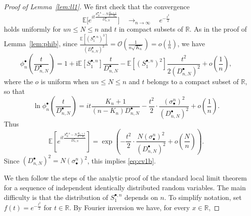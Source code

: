 \documentclass[AHL,XML,longabstracts,Unicode]{cedram}
\newcommand{\E}{\mathbb{E}}
\newcommand{\R}{\mathbb{R}}
\def\sbn{\sigma_{\bullet}^{n}}
\def\Sbn{S^{\bullet,n}}
\def\phibn{\phi^{\bullet}_{n}}
\def\DbnN{D^{\bullet}_{n,N}}
\newcommand\Es[1]{\mathbb{E}\left[#1\right]}
\begin{document}
\begin{proof}[Proof of Lemma~\ref{lem:ll1}]
We first check that the convergence
\begin{equation}
\label{eq:cv1b}\E\bigg[e^{i t \frac{\Sbn_{N}-N \frac{K_{n}+1}{n-K_{n}} }{ \DbnN }} \bigg]  \quad \mathop{\longrightarrow}_{n \rightarrow \infty} \quad e^{- \frac{t^{2}}{2}}
\end{equation}
holds uniformly for $un \leq N \leq n$ and $t$ in compact subsets of $\R$.  As in the proof of Lemma~\ref{lem:phib}, since $\tfrac{\E[(\Sbn_{1})^{3}]}{(\DbnN)^{3}}=\mathcal O(\tfrac{1}{n \sqrt{K_{n}}})= o(\frac{1}{n})$, we have
\[\phibn\left( \frac{t}{ \DbnN } \right)=1+\textrm{i}\E[\Sbn_{1}] \frac{t}{ \DbnN } - \E[(\Sbn_{1})^{2}] \frac{t^{2}}{2(\DbnN)^{2}}+ o \left( \frac{1}{n} \right),\]
where the $o$ is uniform when $un \leq N \leq n$ and $t$ belongs to a compact subset of $\R$, so that
\[\ln \phibn \left( \frac{t}{ \DbnN } \right)=it  \frac{K_{n}+1}{(n-K_{n})\DbnN} - \frac{t^{2}}{2} \cdot \frac{(\sbn)^{2}}{(\DbnN )^{2}}+ o \left( \frac{1}{n} \right).\]
Thus
\[\Es{e^{i t \frac{\Sbn_{N}-N \frac{K_{n}+1}{n-K_{n}} }{ \DbnN }}}= \exp \left(- \frac{t^{2}}{2} \cdot  \frac{ N (\sbn)^{2} }{(\DbnN)^{2}} + o \left( \frac{N}{n} \right)   \right).\]
Since $(\DbnN)^{2}= N (\sbn)^{2}$, this  implies \eqref{eq:cv1b}.


We then follow the steps of the analytic proof of the standard local limit theorem for a sequence of independent identically distributed random variables. The main difficulty is that the distribution of $\Sbn_{1}$ depends on $n$. To simplify notation, set $f(t)= e^{- \frac{t^{2}}{2}}$ for $t \in \R$. By Fourier inversion we have, for every $x \in \mathbb{R}$,


\end{proof}
\end{document}

